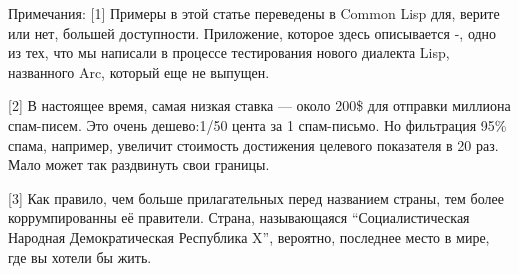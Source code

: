 \documentclass[ebook,12pt,oneside,openany]{memoir}
\begin{document}
Примечания: [1] Примеры в этой статье переведены в Common Lisp для,
верите или нет, большей доступности. Приложение, которое здесь
описывается -, одно из тех, что мы написали в процессе тестирования
нового диалекта Lisp, названного Arc, который еще не выпущен.

[2] В настоящее время, самая низкая ставка — около 200\$ для отправки
миллиона спам-писем. Это очень дешево:1/50 цента за 1 спам-письмо. Но
фильтрация 95\% спама, например, увеличит стоимость достижения
целевого показателя в 20 раз. Мало может так раздвинуть свои границы.

[3] Как правило, чем больше прилагательных перед названием страны, тем
более коррумпированны её правители. Страна, называющаяся
“Социалистическая Народная Демократическая Республика X”, вероятно,
последнее место в мире, где вы хотели бы жить.
\end{document}
